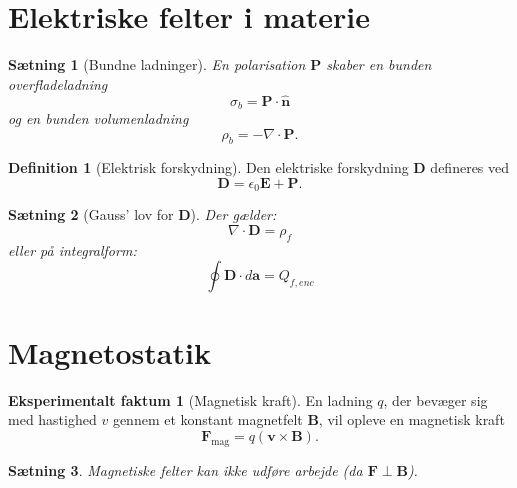 \documentclass[]{article}
\newtheorem{theorem}{Sætning}
\theoremstyle{definition}
\newtheorem{definition}{Definition}
\newtheorem{experimental}{Eksperimentalt faktum}
\begin{document}
\section{Elektriske felter i materie}

\begin{theorem}[Bundne ladninger]
	En polarisation $\mathbf{P}$ skaber en bunden overfladeladning
	\begin{equation*}
		\sigma_b = \mathbf{P} \cdot \hat {\mathbf{n}} 
	\end{equation*}
	og en bunden volumenladning
	\begin{equation*}
		\rho_b = - \nabla \cdot \mathbf{P}.
	\end{equation*}
\end{theorem}

\begin{definition}[Elektrisk forskydning]
	Den elektriske forskydning $\mathbf{D}$ defineres ved
	\begin{equation*}
		\mathbf{D} = \epsilon_0 \mathbf{E}+\mathbf{P}.
	\end{equation*}
\end{definition}

\begin{theorem}[Gauss' lov for $\mathbf{D}$]
	Der gælder:
	\begin{equation*}
		\nabla \cdot \mathbf{D} = \rho_f
	\end{equation*}
	eller på integralform:
	\begin{equation*}
		\oint \mathbf{D} \cdot d\mathbf{a} = Q_{f, enc}
	\end{equation*}
\end{theorem}

\section{Magnetostatik}
\begin{experimental}[Magnetisk kraft]
	En ladning $q$, der bevæger sig med hastighed $v$ gennem et konstant magnetfelt $\mathbf{B}$, vil opleve en magnetisk kraft
	\begin{equation*}
		\mathbf{F}_\text{mag} = q(\mathbf{v} \times \mathbf{B}).
	\end{equation*}
\end{experimental}
\begin{theorem}
	Magnetiske felter kan ikke udføre arbejde (da $\mathbf{F} \perp \mathbf{B}$).
\end{theorem}
\end{document}
